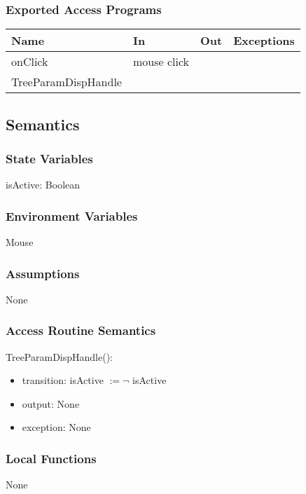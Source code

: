 \documentclass[12pt, titlepage]{article}
\begin{document}
\subsubsection{Exported Access Programs}

\begin{center}
\begin{tabular}{| l | l | l | p{5cm}|}
\hline
\textbf{Name} & \textbf{In} & \textbf{Out} & \textbf{Exceptions} \\
\hline
onClick & mouse click &  &  \\
\hline
TreeParamDispHandle &&&\\
\hline
\end{tabular}
\end{center}

\subsection{Semantics}

\subsubsection{State Variables}
isActive: Boolean

\subsubsection{Environment Variables}
Mouse
\subsubsection{Assumptions}
None
\subsubsection{Access Routine Semantics}

\noindent TreeParamDispHandle():
\begin{itemize}
\item transition: isActive $\mathit{:= \neg}$ isActive
\item output: None
\item exception: None
\end{itemize}
\subsubsection{Local Functions}
None


\newpage
\end{document}
